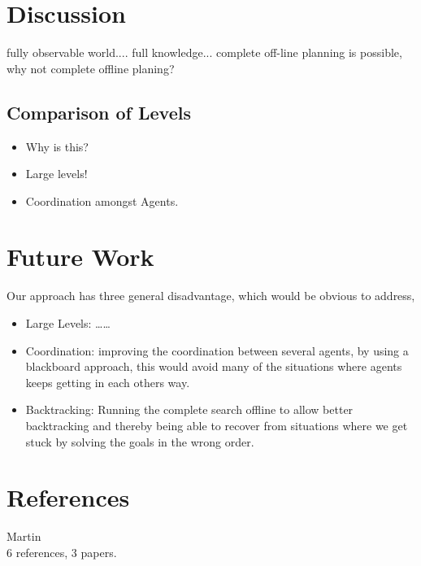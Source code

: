 \documentclass[letterpaper]{article}
\begin{document}
\section{Discussion}
	fully observable world.... full knowledge... complete off-line planning is possible, why not complete offline planing?
	\subsection{Comparison of Levels}
	\begin{itemize}
		\item{Why is this?}
		\item{Large levels!}
		\item{Coordination amongst Agents.}
	\end{itemize}


\section{Future Work}
	Our approach has three general disadvantage, which would be obvious to address,
	\begin{itemize}
		\item{Large Levels:}
			\dots \dots
		\item{Coordination:}
			improving the coordination between several agents, by using a blackboard approach, this would avoid many of the situations where agents keeps getting in each others way.
		\item{Backtracking:}
			Running the complete search offline to allow better backtracking and thereby being able to recover from situations where we get stuck by solving the goals in the wrong order. 
	\end{itemize}

\section{References}
	Martin\\
	6 references, 3 papers.
		
		


\end{document}
